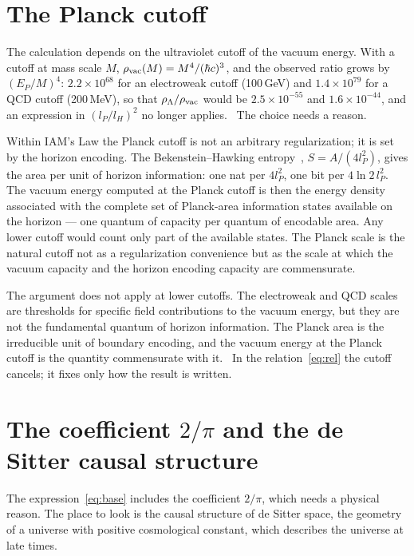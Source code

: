\section{The Planck cutoff}\label{sec:lam_cutoff}
The calculation depends on the ultraviolet cutoff of the vacuum energy. With a cutoff at mass scale $M$,
$\rho_{\rm vac}(M)=M^4/(\hbar c)^3$, and the observed ratio grows by $(E_P/M)^4$: $2.2\times10^{68}$ for an electroweak cutoff
(100\,GeV) and $1.4\times10^{79}$ for a QCD cutoff (200\,MeV), so that $\rho_\Lambda/\rho_{\rm vac}$ would be $2.5\times10^{-55}$ and
$1.6\times10^{-44}$, and an expression in $(l_P/l_H)^2$ no longer applies. \calc\ The choice needs a reason.

Within IAM's Law the Planck cutoff is not an arbitrary regularization; it is set by the horizon encoding. The Bekenstein--Hawking
entropy~\cite{Bekenstein1973,Hawking1975}, $S=A/(4l_P^2)$, gives the area per unit of horizon information: one nat per $4l_P^2$, one
bit per $4\ln2\,l_P^2$. The vacuum energy computed at the Planck cutoff is then the energy density associated with the complete set of
Planck-area information states available on the horizon --- one quantum of capacity per quantum of encodable area. Any lower cutoff
would count only part of the available states. The Planck scale is the natural cutoff not as a regularization convenience but as the
scale at which the vacuum capacity and the horizon encoding capacity are commensurate. \interp

The argument does not apply at lower cutoffs. The electroweak and QCD scales are thresholds for specific field contributions to the
vacuum energy, but they are not the fundamental quantum of horizon information. The Planck area is the irreducible unit of boundary
encoding, and the vacuum energy at the Planck cutoff is the quantity commensurate with it. \interp\ In the relation~\eqref{eq:rel}
the cutoff cancels; it fixes only how the result is written.

\section{The coefficient $2/\pi$ and the de Sitter causal structure}\label{sec:lam_twopi}
The expression~\eqref{eq:base} includes the coefficient $2/\pi$, which needs a physical reason. The place to look is the causal
structure of de Sitter space, the geometry of a universe with positive cosmological constant, which describes the universe at late
times.

